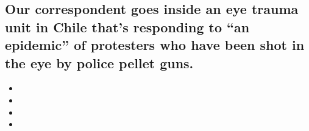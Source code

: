 \hypertarget{our-correspondent-goes-inside-an-eye-trauma-unit-in-chile-thats-responding-to-an-epidemic-of-protesters-who-have-been-shot-in-the-eye-by-police-pellet-guns-1}{%
\subsection{Our correspondent goes inside an eye trauma unit in Chile
that's responding to ``an epidemic'' of protesters who have been shot in
the eye by police pellet
guns.}\label{our-correspondent-goes-inside-an-eye-trauma-unit-in-chile-thats-responding-to-an-epidemic-of-protesters-who-have-been-shot-in-the-eye-by-police-pellet-guns-1}}

\begin{itemize}
\item
\item
\item
\item
\end{itemize}


